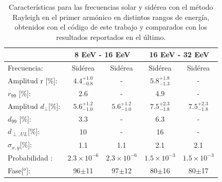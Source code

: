 \begin{table}[H]
    \begin{small}
        \begin{center}
            \begin{tabular}[c]{l|c|c||c|c|}
                                            & \multicolumn{2}{c||}{8 EeV - 16 EeV}              & \multicolumn{2}{c|}{16 EeV - 32 EeV}                   \\ \hline
                Frecuencia:                 & Sidérea                    & Sidérea \cite{Aab_2020} & Sidérea                   & Sidérea \cite{Aab_2020}   \\ \hline
                Amplitud r [\%]:            & $4.4^{+1.0}_{-0.8}$ 	    & -                      & $5.8^{+1.8}_{-1.3}$ 	    & -                         \\
                $r_{99}$ [\%]:              & 2.6                       & -                      & 4.9                      & -                          \\\hline
                Amplitud $d_\perp$[\%]:     & $5.6^{+1.2}_{-1.0}$ 	    & $5.6^{+1.2}_{-1.0}$    & $7.5^{+2.3}_{-1.8}$ 	    & $7.5^{+2.3}_{-1.8}$                   \\
                $d_{99}$ [\%]:              & 3.3                       & -                      & 6.3                      & -                         \\
                $d_{\perp,UL}$[\%]:         & 10                        & -                      & 16                       & -                                 \\\hline
                $\sigma_{x,y}$[\%]:         & 1.1	                    & 1.1                    & 2.1	                    & 2.1                           \\
                Probabilidad      :         & $2.3\times10^{-6}$	    & $2.3\times10^{-6}$     & $1.5\times10^{-3}$	    & $1.5\times10^{-3}$              \\
                Fase[$^o$]:                 & 96$\pm$11                 & 97$\pm$12              & 80$\pm$16                & 80$\pm$17                     \\\hline
            \end{tabular}
        \end{center}
    \end{small}
    \caption{Características para las frecuencias solar y sidérea con el método Rayleigh en el primer armónico en distintos rangos de energía, obtenidos con el código de este trabajo \cite{Aab_2020} y comparados con los resultados reportados en el último.}
\end{table}


